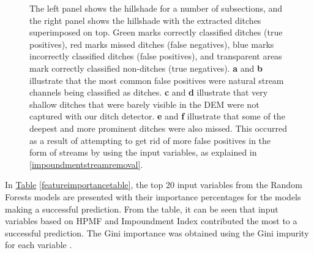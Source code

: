 \documentclass[]{interact}
\theoremstyle{plain}%
\theoremstyle{definition}
\theoremstyle{remark}
\begin{document}
\begin{figure} [!htb]
    \caption{The left panel shows the hillshade for a number of subsections, and the right panel shows the hillshade with the extracted ditches superimposed on top. Green marks correctly classified ditches (true positives), red marks missed ditches (false negatives), blue marks incorrectly classified ditches (false positives), and transparent areas mark correctly classified non-ditches (true negatives). \textbf{a} and \textbf{b} illustrate that the most common false positives were natural stream channels being classified as ditches. \textbf{c} and \textbf{d} illustrate that very shallow ditches that were barely visible in the DEM were not captured with our ditch detector. \textbf{e} and \textbf{f} illustrate that some of the deepest and more prominent ditches were also missed. This occurred as a result of attempting to get rid of more false positives in the form of streams by using the input variables, as explained in \ref{impoundmentstreamremoval}.}
    \label{fig:resultsillustrations}
\end{figure}
\clearpage

In \hyperref[featureimportancetable]{Table} \ref{featureimportancetable}, the top 20 input variables from the Random Forests models are presented with their importance percentages for the models making a successful prediction. From the table, it can be seen that input variables based on HPMF and Impoundment Index contributed the most to a successful prediction. The Gini importance was obtained using the Gini impurity for each variable \citep{gini}.
\end{document}
